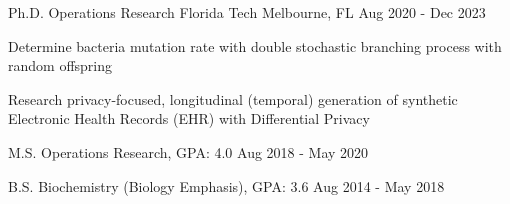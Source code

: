 
\begin{cventries}
	\cventry
	{Ph.D. Operations Research}
	{Florida Tech}
	{Melbourne, FL}
	{Aug 2020 - Dec 2023}
	{\begin{cvitems}
			\item {Determine bacteria mutation rate with double stochastic branching process with random offspring}
			\item {Research privacy-focused, longitudinal (temporal) generation of synthetic Electronic Health Records (EHR) with Differential Privacy}
		\end{cvitems}}
	\vspace{-2mm}

	\cventry
	{M.S. Operations Research, GPA: 4.0}
	{}
	{}
	{Aug 2018 - May 2020}
	{}
	\vspace{-5mm}

	\cventry
	{B.S. Biochemistry (Biology Emphasis), GPA: 3.6}
	{}
	{}
	{Aug 2014 - May 2018}
	{}
	\vspace{-5mm}

\end{cventries}